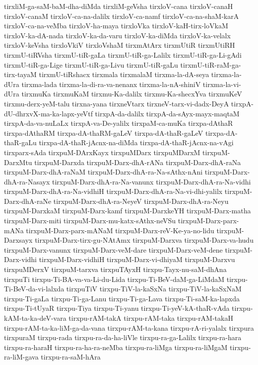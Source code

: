 {tirxliM-ga-saM-baM-dha-diMda
tirxliM-geVsha
tirxloV-cana
tirxloV-canaH
tirxloV-canaM
tirxloV-ca-na-dalilx
tirxloV-ca-namf
tirxloV-ca-na-shaM-karA
tirxloV-ca-na-veMba
tirxloV-ha-maya
tirxloVka
tirxloV-kaH-tirx-loVkaM
tirxloV-ka-dA-nada
tirxloV-ka-da-varu
tirxloV-ka-diMda
tirxloV-ka-velalx
tirxloV-keVsha
tirxloVkiV
tirxloVshaM
tirxmAtArx
tirxmUtiR
tirxmUtiRH
tirxmU-tiRVsha
tirxmU-tiR-gaLa
tirxmU-tiR-ga-Lalilx
tirxmU-tiR-ga-Li-gAdi
tirxmU-tiR-ga-Lige
tirxmU-tiR-ga-Livu
tirxmU-tiR-gaLu
tirxmU-tiR-raM-ga-tirx-tayaM
tirxmU-tiRshacx
tirxmala
tirxmalaM
tirxma-la-dA-seya
tirxma-la-dUra
tirxma-lada
tirxma-la-di-ra-va-nenanx
tirxma-la-nA-shiniV
tirxma-la-vi-dUra
tirxmuKa
tirxmuKaM
tirxmu-Ka-dalilx
tirxmu-Ka-shecxYva
tirxmuKeV
tirxmu-derx-yeM-talu
tirxna-yana
tirxneVtarx
tirxneV-tarx-vi-dadx-DeyA
tirxpA-dU-dhrxvX-ma-ka-lapx-yeVtf
tirxpA-da-dalilx
tirxpA-da-sAyx-mayx-maqtaM
tirxpA-da-va-nuLaLx
tirxpA-va-De-yalilx
tirxpaM-ca-muKa
tirxpa-dAthaR
tirxpa-dAthaRM
tirxpa-dA-thaRM-gaLeV
tirxpa-dA-thaR-gaLeV
tirxpa-dA-thaR-gaLu
tirxpa-dA-thaR-jAcnx-na-diMda
tirxpa-dA-thaR-jAcnx-na-vAgi
tirxparx-sAda
tirxpuM-DArxKayx
tirxpuMDarx
tirxpuMDarxM
tirxpuM-DarxMtu
tirxpuM-Darxda
tirxpuM-Darx-dhA-rANa
tirxpuM-Darx-dhA-raNa
tirxpuM-Darx-dhA-raNaM
tirxpuM-Darx-dhA-ra-Na-sAthx-nAni
tirxpuM-Darx-dhA-ra-Nasayx
tirxpuM-Darx-dhA-ra-Na-vanunx
tirxpuM-Darx-dhA-ra-Na-vidhi
tirxpuM-Darx-dhA-ra-Na-vidhiH
tirxpuM-Darx-dhA-ra-Na-vi-dhi-yalilx
tirxpuM-Darx-dhA-raNe
tirxpuM-Darx-dhA-ra-NeyeV
tirxpuM-Darx-dhA-ra-Neyu
tirxpuM-DarxkaM
tirxpuM-Darx-kamf
tirxpuM-DarxkeYH
tirxpuM-Darx-matha
tirxpuM-Darx-miti
tirxpuM-Darx-mu-katx-sAthx-neVSu
tirxpuM-Darx-parx-mANa
tirxpuM-Darx-parx-mANaM
tirxpuM-Darx-reV-Ke-ya-no-lidu
tirxpuM-Darxsayx
tirxpuM-Darx-tirx-gu-NAtAmx
tirxpuM-Darxva
tirxpuM-Darx-va-hudu
tirxpuM-Darx-vanunx
tirxpuM-Darx-veM-dare
tirxpuM-Darx-veM-dene
tirxpuM-Darx-vidhi
tirxpuM-Darx-vidhiH
tirxpuM-Darx-vi-dhiyaM
tirxpuM-Darxvu
tirxpuMDerxV
tirxpuM-tarxva
tirxpuTAyxH
tirxpu-Tayx-nu-saM-dhAna
tirxpuTi
tirxpu-Ti-BA-va-va-Li-du-Lida
tirxpu-Ti-BeV-daM-ga-LiMdaM
tirxpu-Ti-BeV-da-vi-lalxda
tirxpuTiV
tirxpu-TiV-la-kaSxNa
tirxpu-TiV-la-kaSxNaM
tirxpu-Ti-gaLa
tirxpu-Ti-ga-Lanu
tirxpu-Ti-ga-Lava
tirxpu-Ti-saM-ka-lapxda
tirxpu-Ti-tUyaR
tirxpu-Tiya
tirxpu-Ti-yanu
tirxpu-Ti-yeV-kA-thaR-vAda
tirxpu-kAM-ta-ka-deV-vara
tirxpu-rAM-takA
tirxpu-rAM-taka
tirxpu-rAM-takaH
tirxpu-rAM-ta-ka-liM-ga-da-vana
tirxpu-rAM-ta-kana
tirxpu-rA-ri-yalalx
tirxpura
tirxpuraM
tirxpu-rada
tirxpu-ra-da-ha-liVle
tirxpu-ra-ga-Lalilx
tirxpu-ra-hara
tirxpu-ra-haraH
tirxpu-ra-ha-ra-neMba
tirxpu-ra-liMga
tirxpu-ra-liMgaM
tirxpu-ra-liM-gava
tirxpu-ra-saM-hAra
}

